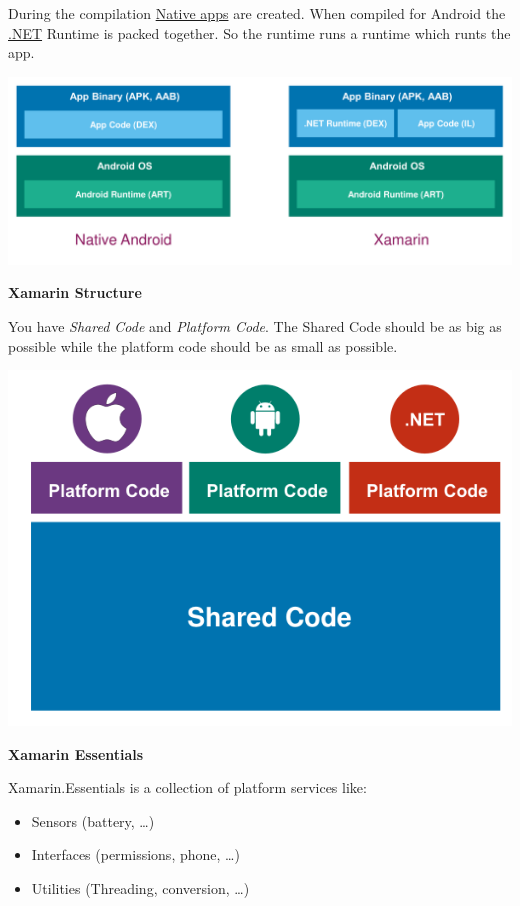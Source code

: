 \documentclass[10pt,twoside,landscape]{article}
\begin{document}
\begin{multicols}{4}
During the compilation \href{../../../roam/20210921091753-native_apps.org}{Native apps} are created.
When compiled for Android the \href{../../../roam/20211003114703-net.org}{.NET} Runtime is packed together.
So the runtime runs a runtime which runts the app.


\begin{center}
\includegraphics[width=.9\linewidth]{img/xamarin_native_android.png}
\end{center}

\textbf{Xamarin Structure}

You have \emph{Shared Code} and \emph{Platform Code}.
The Shared Code should be as big as possible while the platform code should be as small as possible.


\begin{center}
\includegraphics[width=.9\linewidth]{img/shared_platform_code.png}
\end{center}

\textbf{Xamarin Essentials}

Xamarin.Essentials is a collection of platform services like:
\begin{itemize}
\item Sensors (battery, \ldots{})
\item Interfaces (permissions, phone, \ldots{})
\item Utilities (Threading, conversion, \ldots{})
\end{itemize}



\end{multicols}
\end{document}
